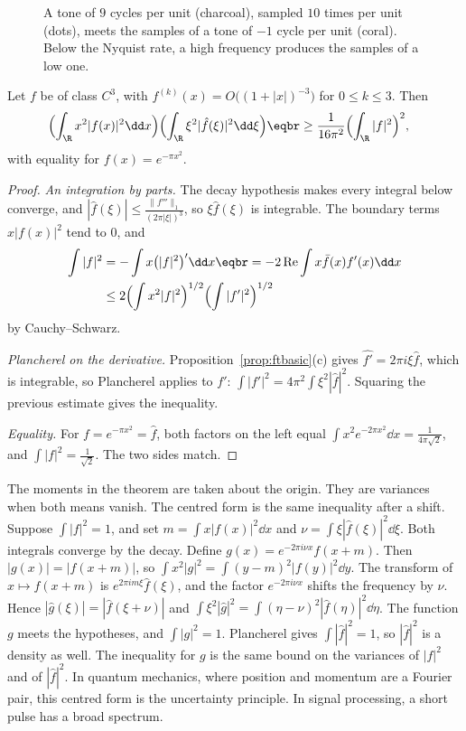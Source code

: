 \begin{figure}[ht]
\centering
{}
\caption{A tone of $9$ cycles per unit (charcoal), sampled $10$ times per unit (dots), meets the samples of a tone of $-1$ cycle per unit (coral). Below the Nyquist rate, a high frequency produces the samples of a low one.}
\label{fig:alias}
\end{figure}

\begin{theorem}\label{thm:heisenberg}
Let $f$ be of class $C^3$, with $f^{(k)}(x)=O\bigl((1+|x|)^{-3}\bigr)$ for $0\le k\le3$. Then
\[
\begin{aligned}\Bigl(\int_{\R}x^2|f(x)|^2\dd x\Bigr)&\Bigl(\int_{\R}\xi^2|\hat f(\xi)|^2\dd\xi\Bigr)\eqbr\ge\frac1{16\pi^2}\Bigl(\int_{\R}|f|^2\Bigr)^2,\end{aligned}
\]
with equality for $f(x)=e^{-\pi x^2}$.
\end{theorem}
\begin{proof}
\emph{An integration by parts.} The decay hypothesis makes every integral below converge, and $|\hat f(\xi)|\le\frac{\|f'''\|_1}{(2\pi|\xi|)^3}$, so $\xi\hat f(\xi)$ is integrable. The boundary terms $x|f(x)|^2$ tend to $0$, and
\[
\begin{aligned}\int|f|^2&=-\int x\bigl(|f|^2\bigr)'\dd x\eqbr=-2\operatorname{Re}\int x\bar f(x)f'(x)\dd x\\&\le2\Bigl(\int x^2|f|^2\Bigr)^{1/2}\Bigl(\int|f'|^2\Bigr)^{1/2}\end{aligned}
\]
by Cauchy--Schwarz.

\emph{Plancherel on the derivative.} Proposition~\ref{prop:ftbasic}(c) gives $\widehat{f'}=2\pi i\xi\hat f$, which is integrable, so Plancherel applies to $f'$: $\int|f'|^2=4\pi^2\int\xi^2|\hat f|^2$. Squaring the previous estimate gives the inequality.

\emph{Equality.} For $f=e^{-\pi x^2}=\hat f$, both factors on the left equal $\int x^2e^{-2\pi x^2}\dd x=\frac1{4\pi\sqrt2}$, and $\int|f|^2=\frac1{\sqrt2}$. The two sides match.
\end{proof}

The moments in the theorem are taken about the origin. They are variances when both means vanish. The centred form is the same inequality after a shift. Suppose $\int|f|^2=1$, and set $m=\int x|f(x)|^2\dd x$ and $\nu=\int\xi|\hat f(\xi)|^2\dd\xi$. Both integrals converge by the decay. Define $g(x)=e^{-2\pi i\nu x}f(x+m)$. Then $|g(x)|=|f(x+m)|$, so $\int x^2|g|^2=\int(y-m)^2|f(y)|^2\dd y$. The transform of $x\mapsto f(x+m)$ is $e^{2\pi im\xi}\hat f(\xi)$, and the factor $e^{-2\pi i\nu x}$ shifts the frequency by $\nu$. Hence $|\hat g(\xi)|=|\hat f(\xi+\nu)|$ and $\int\xi^2|\hat g|^2=\int(\eta-\nu)^2|\hat f(\eta)|^2\dd\eta$. The function $g$ meets the hypotheses, and $\int|g|^2=1$. Plancherel gives $\int|\hat f|^2=1$, so $|\hat f|^2$ is a density as well. The inequality for $g$ is the same bound on the variances of $|f|^2$ and of $|\hat f|^2$. In quantum mechanics, where position and momentum are a Fourier pair, this centred form is the uncertainty principle. In signal processing, a short pulse has a broad spectrum.

